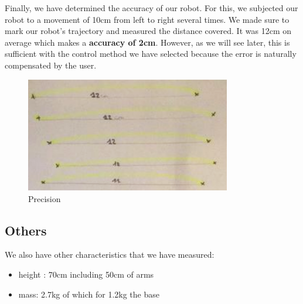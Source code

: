 Finally, we have determined the accuracy of our robot. For this, we subjected our robot to a movement of 10cm from left to right several times. We made sure to mark our robot's trajectory and measured the distance covered. It was 12cm on average which makes a \textbf{accuracy of 2cm}. However, as we will see later, this is sufficient with the control method we have selected because the error is naturally compensated by the user.
\begin{figure}[ht]
    \centering
    \includegraphics[width=0.8\textwidth]{Images/Section04/precision.png}
    \caption{Precision}
    \label{fig:Precision}
\end{figure}
\FloatBarrier

\subsection{Others}

We also have other characteristics that we have measured:
\begin{itemize}[noitemsep]
    \item height : 70cm including 50cm of arms
    \item mass: 2.7kg of which for 1.2kg the base
\end{itemize}
